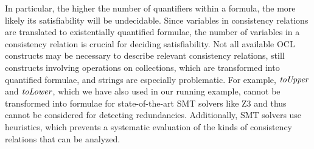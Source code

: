 In particular, the higher the number of quantifiers within a formula, the more likely its satisfiability will be undecidable.
Since variables in consistency relations are translated to existentially quantified formulae, the number of variables in a consistency relation is crucial for deciding satisfiability.
Not all available \gls{OCL} constructs may be necessary to describe relevant consistency relations, still constructs involving operations on collections, which are transformed into quantified formulae, and strings are especially problematic.
For example, $\mathit{toUpper}$ and $\mathit{toLower}$, which we have also used in our running example, cannot be transformed into formulae for state-of-the-art \gls{SMT} solvers like Z3 and thus cannot be considered for detecting redundancies.
Additionally, \gls{SMT} solvers use heuristics, which prevents a systematic evaluation of the kinds of consistency relations that can be analyzed.



